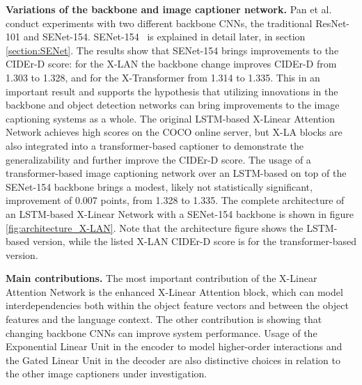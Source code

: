 \documentclass[english,twoside,openright]{HYgraduMLDS}
\begin{document}
\textbf{Variations of the backbone and image captioner network.} Pan et al.~\cite{XLinearAN} conduct experiments with two different backbone CNNs, the traditional ResNet-101 and SENet-154. SENet-154~\cite{SENet} is explained in detail later, in section \ref{section:SENet}. The results show that SENet-154 brings improvements to the CIDEr-D score: for the X-LAN the backbone change improves CIDEr-D from 1.303 to 1.328, and for the X-Transformer from 1.314 to 1.335. This in an important result and supports the hypothesis that utilizing innovations in the backbone and object detection networks can bring improvements to the image captioning systems as a whole. The original LSTM-based X-Linear Attention Network achieves high scores on the COCO online server, but  X-LA blocks are also integrated into a transformer-based captioner to demonstrate the generalizability and further improve the CIDEr-D score. The usage of a transformer-based image captioning network over an LSTM-based on top of the SENet-154 backbone brings a modest, likely not statistically significant, improvement of 0.007 points, from 1.328 to 1.335. The complete architecture of an LSTM-based X-Linear Network with a SENet-154 backbone is shown in figure \ref{fig:architecture_X-LAN}. Note that the architecture figure shows the LSTM-based version, while the listed X-LAN CIDEr-D score is for the transformer-based version. 

\textbf{Main contributions.} The most important contribution of the X-Linear Attention Network is the enhanced X-Linear Attention block, which can model interdependencies both within the object feature vectors and between the object features and the language context. The other contribution is showing that changing backbone CNNs can improve system performance. Usage of the Exponential Linear Unit in the encoder to model higher-order interactions and the Gated Linear Unit in the decoder are also distinctive choices in relation to the other image captioners under investigation.
\end{document}
